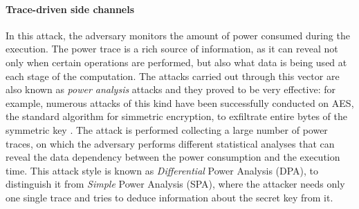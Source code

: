 \documentclass[12pt,a4paper]{book}
\theoremstyle{definition}
\begin{document}
	\paragraph{Trace-driven side channels} In this attack, the adversary monitors the amount of power consumed during the execution. The power trace is a rich source of information, as it can reveal not only when certain operations are performed, but also what data is being used at each stage of the computation. The attacks carried out through this vector are also known as \textit{power analysis} attacks and they proved to be very effective: for example, numerous attacks of this kind have been successfully conducted on AES, the standard algorithm for simmetric encryption, to exfiltrate entire bytes of the symmetric key \cite{Buchanan2017} \cite{Mangard2003} \cite{Mangard2010} \cite{Oswald2004}. The attack is performed collecting a large number of power traces, on which the adversary performs different statistical analyses that can reveal the data dependency between the power consumption and the execution time. This attack style is known as \textit{Differential} Power Analysis (DPA), to distinguish it from \textit{Simple} Power Analysis (SPA), where the attacker needs only one single trace and tries to deduce information about the secret key from it.
\end{document}
